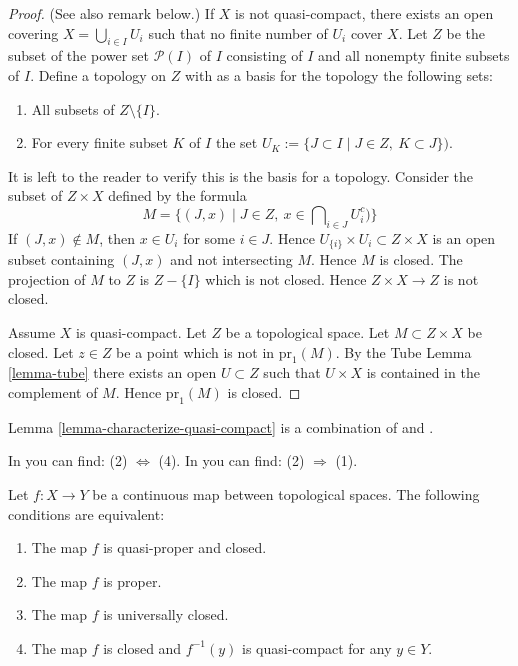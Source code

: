 \begin{proof}
(See also remark below.)
If $X$ is not quasi-compact, there exists an open covering
$X = \bigcup_{i \in I} U_i$ such that no finite
number of $U_i$ cover $X$.
Let $Z$ be the subset of the power set $\mathcal{P}(I)$ of $I$
consisting of $I$ and all nonempty finite subsets of $I$.
Define a topology on $Z$ with as a basis for the topology
the following sets:
\begin{enumerate}
\item All subsets of $Z\setminus\{I\}$.
\item For every finite subset $K$ of $I$ the set
$U_K := \{J\subset I \mid J \in Z, \ K\subset J \})$.
\end{enumerate}
It is left to the reader to verify this is the basis for a topology.
Consider the subset of $Z \times X$ defined by the formula
$$
M = \{(J, x) \mid J \in Z, \ x \in \bigcap\nolimits_{i \in J} U_i^c)\}
$$
If $(J, x) \not \in M$, then $x \in U_i$ for some $i \in J$.
Hence $U_{\{i\}} \times U_i \subset Z \times X$ is an open
subset containing $(J, x)$ and not intersecting $M$. Hence
$M$ is closed. The projection of $M$ to $Z$ is $Z-\{I\}$
which is not closed. Hence $Z \times X \to Z$ is not closed.

\medskip\noindent
Assume $X$ is quasi-compact. Let $Z$ be a topological space.
Let $M \subset  Z \times X$ be closed. Let $z \in Z$ be a point
which is not in $\text{pr}_1(M)$. By the Tube Lemma \ref{lemma-tube}
there exists an open $U \subset Z$ such that $U \times X$ is
contained in the complement of $M$. Hence $\text{pr}_1(M)$ is closed.
\end{proof}

\begin{remark}
\label{remark-lemma-literature}
Lemma \ref{lemma-characterize-quasi-compact} is a combination of
\cite[I, p. 75, Lemme 1]{Bourbaki} and
\cite[I, p. 76, Corrolaire 1]{Bourbaki}.
\end{remark}

\begin{theorem}
\label{theorem-characterize-proper}
\begin{reference}
In \cite[I, p. 75, Theorem 1]{Bourbaki} you can find:
(2) $\Leftrightarrow$ (4).
In \cite[I, p. 77, Proposition 6]{Bourbaki} you can find:
(2) $\Rightarrow$ (1).
\end{reference}
Let $f: X\to Y$ be a continuous map between
topological spaces. The following conditions are equivalent:
\begin{enumerate}
\item The map $f$ is quasi-proper and closed.
\item The map $f$ is proper.
\item The map $f$ is universally closed.
\item The map $f$ is closed and $f^{-1}(y)$ is quasi-compact for any
$y\in Y$.
\end{enumerate}
\end{theorem}

